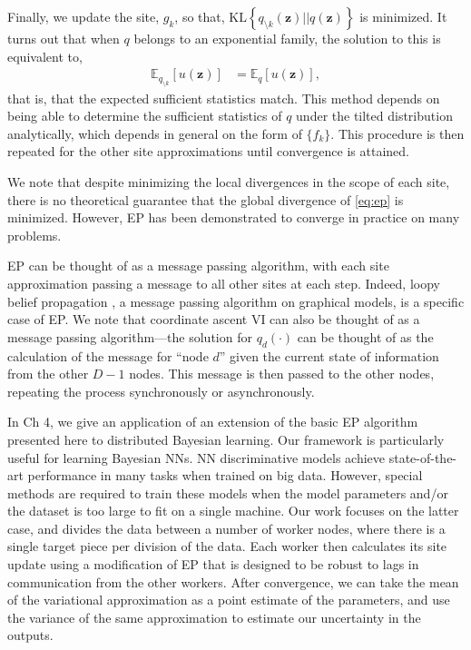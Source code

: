 Finally, we update the site, $g_k$, so that, $\text{KL}\left\{q_{\setminus k}(\mathbf{z})||q(\mathbf{z})\right\}$ is minimized. It turns out that when $q$ belongs to an exponential family, the solution to this is equivalent to,
\begin{align*}
	\mathbb{E}_{q_{\setminus k}}[u(\mathbf{z})] &= \mathbb{E}_{q}[u(\mathbf{z})],
\end{align*}
that is, that the expected sufficient statistics match. This method depends on being able to determine the sufficient statistics of $q$ under the tilted distribution analytically, which depends in general on the form of $\{f_k\}$. This procedure is then repeated for the other site approximations until convergence is attained. 

We note that despite minimizing the local divergences in the scope of each site, there is no theoretical guarantee that the global divergence of \eqref{eq:ep} is minimized. However, EP has been demonstrated to converge in practice on many problems.

EP can be thought of as a message passing algorithm, with each site approximation passing a message to all other sites at each step. Indeed, loopy belief propagation \citep[Ch 11]{KollerFriedman2009}, a message passing algorithm on graphical models, is a specific case of EP. We note that coordinate ascent VI can also be thought of as a message passing algorithm---the solution for $q_d(\cdot)$ can be thought of as the calculation of the message for ``node $d$'' given the current state of information from the other $D-1$ nodes. This message is then passed to the other nodes, repeating the process synchronously or asynchronously.

In Ch 4, we give an application of an extension of the basic EP algorithm presented here to distributed Bayesian learning. Our framework is particularly useful for learning Bayesian NNs. NN discriminative models achieve state-of-the-art performance in many tasks when trained on big data. However, special methods are required to train these models when the model parameters and/or the dataset is too large to fit on a single machine. Our work focuses on the latter case, and divides the data between a number of worker nodes, where there is a single target piece per division of the data. Each worker then calculates its site update using a modification of EP that is designed to be robust to lags in communication from the other workers. After convergence, we can take the mean of the variational approximation as a point estimate of the parameters, and use the variance of the same approximation to estimate our uncertainty in the outputs.

